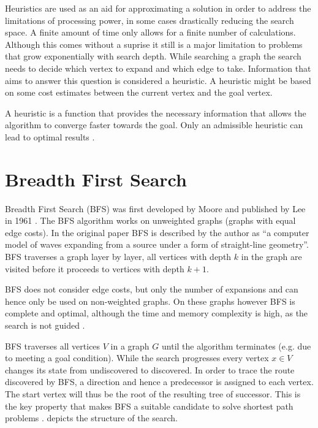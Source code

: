Heuristics are used as an aid for approximating a solution in order to address the limitations of processing power, in some cases drastically reducing the search space. A finite amount of time only allows for a finite number of calculations. Although this comes without a suprise it still is a major limitation to problems that grow exponentially with search depth. While searching a graph the search needs to decide which vertex to expand and which edge to take. Information that aims to answer this question is considered a heuristic. A heuristic might be based on some cost estimates between the current vertex and the goal vertex. \cite{Newell.1976} 

A heuristic is a function that provides the necessary information that allows the algorithm to converge faster towards the goal. Only an admissible heuristic can lead to optimal results \cite{Hart.1968}.

\section{Breadth First Search}
Breadth First Search (BFS) was first developed by Moore and published by Lee in 1961 \cite{Lee.1961}. The BFS algorithm works on unweighted graphs (graphs with equal edge costs). In the original paper BFS is described by the author as ``a computer model of waves expanding from a source under a form of straight-line geometry''. BFS traverses a graph layer by layer, all vertices with depth $k$ in the graph are visited before it proceeds to vertices with depth $k+1$.

BFS does not consider edge costs, but only the number of expansions and can hence only be used on non-weighted graphs. On these graphs however BFS is complete and optimal, although the time and memory complexity is high, as the search is not guided \cite{Lee.1961,LaValle.2006} .

BFS traverses all vertices $V$ in a graph $G$ until the algorithm terminates (e.g. due to meeting a goal condition). While the search progresses every vertex $x \in V$ changes its state from undiscovered to discovered. In order to trace the route discovered by BFS, a direction and hence a predecessor is assigned to each vertex. The start vertex will thus be the root of the resulting tree of successor. This is the key property that makes BFS a suitable candidate to solve shortest path problems \cite{Skiena.2008}.  depicts the structure of the search.

